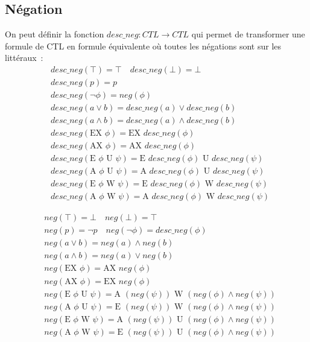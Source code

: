 \documentclass[10pt,a4paper]{article}
\begin{document}
\subsection{Négation}
On peut définir la fonction $desc\_neg:CTL \to CTL$ qui permet de transformer une formule de CTL en formule équivalente où toutes les négations sont sur les littéraux :
\begin{align*}
&desc\_neg(\top) = \top \quad desc\_neg(\bot) = \bot\\
&desc\_neg(p) = p \\
&desc\_neg(\neg \phi) = neg(\phi)\\
&desc\_neg(a \lor b) = desc\_neg(a) \lor desc\_neg(b)\\
&desc\_neg(a \land b) = desc\_neg(a) \land desc\_neg(b)\\
&desc\_neg(\mbox{EX } \phi) = \mbox{EX }desc\_neg(\phi)\\
&desc\_neg(\mbox{AX } \phi) = \mbox{AX }desc\_neg(\phi)\\
&desc\_neg(\mbox{E } \phi \mbox{ U } \psi) =\mbox{E } desc\_neg(\phi) \mbox{ U } desc\_neg(\psi)\\
&desc\_neg(\mbox{A } \phi \mbox{ U } \psi) =\mbox{A } 
desc\_neg(\phi) \mbox{ U } desc\_neg(\psi)\\
&desc\_neg(\mbox{E } \phi \mbox{ W } \psi) =\mbox{E } desc\_neg(\phi) \mbox{ W } desc\_neg(\psi)\\
&desc\_neg(\mbox{A } \phi \mbox{ W } \psi) =\mbox{A } desc\_neg(\phi) \mbox{ W } desc\_neg(\psi)
\end{align*}

\begin{align*}
&neg(\top) = \bot \quad neg(\bot) = \top\\
&neg(p) = \neg p \quad neg(\neg \phi) = desc\_neg(\phi)\\
&neg(a \lor b) = neg(a) \land neg(b)\\
&neg(a \land b) = neg(a) \lor neg(b)\\
&neg(\mbox{EX } \phi) = \mbox{AX }neg(\phi)\\
&neg(\mbox{AX } \phi) = \mbox{EX }neg(\phi)\\
&neg(\mbox{E } \phi \mbox{ U } \psi) =\mbox{A } (neg(\psi)) \mbox{ W } (neg(\phi) \land neg(\psi))\\
&neg(\mbox{A } \phi \mbox{ U } \psi) =\mbox{E } (neg(\psi)) \mbox{ W } (neg(\phi) \land neg(\psi))\\
&neg(\mbox{E } \phi \mbox{ W } \psi) =\mbox{A } (neg(\psi)) \mbox{ U } (neg(\phi) \land neg(\psi))\\
&neg(\mbox{A } \phi \mbox{ W } \psi) =\mbox{E } (neg(\psi)) \mbox{ U } (neg(\phi) \land neg(\psi))
\end{align*}
\end{document}
